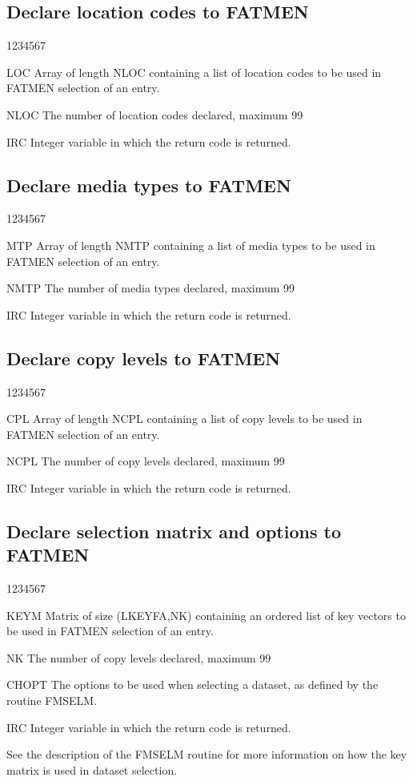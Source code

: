 \subsection{Declare location codes to FATMEN}
\begin{DLtt}{1234567}
\item[LOC]
Array of length NLOC containing a list of location codes
to be used in FATMEN selection of an entry.
\item [NLOC]
The number of location codes declared, maximum 99
\item[IRC]
Integer variable in which the return code is returned.
\end{DLtt}
\subsection{Declare media types to FATMEN}
\begin{DLtt}{1234567}
\item[MTP]
Array of length NMTP containing a list of media types
to be used in FATMEN selection of an entry.
\item[NMTP]
The number of media types declared, maximum 99
\item[IRC]
Integer variable in which the return code is returned.
\end{DLtt}
\subsection{Declare copy levels to FATMEN}
\begin{DLtt}{1234567}
\item[CPL]
Array of length NCPL containing a list of copy levels
to be used in FATMEN selection of an entry.
\item[NCPL]
The number of copy levels declared, maximum 99
\item[IRC]
Integer variable in which the return code is returned.
\end{DLtt}
\subsection{Declare selection matrix and options to FATMEN}
\begin{DLtt}{1234567}
\item[KEYM]
Matrix of size (LKEYFA,NK) containing an ordered
list of key vectors 
to be used in FATMEN selection of an entry.
\item[NK]
The number of copy levels declared, maximum 99
\item[CHOPT]
The options to be used when selecting a dataset,
as defined by the routine FMSELM.
\item[IRC]
Integer variable in which the return code is returned.
\end{DLtt}
\par
See the description of the FMSELM routine for more information
on how the key matrix is used in dataset selection.
